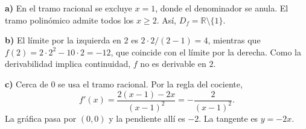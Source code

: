 \textbf{a)} En el tramo racional se excluye $x=1$, donde el denominador se anula. El tramo polinómico admite todos los $x\ge2$. Así, $D_f=\boxed{\mathbb R\setminus\{1\}}$.

\textbf{b)} El límite por la izquierda en $2$ es $2\cdot2/(2-1)=4$, mientras que $f(2)=2\cdot2^2-10\cdot2=-12$, que coincide con el límite por la derecha. Como la derivabilidad implica continuidad, $f$ no es derivable en $2$.

\textbf{c)} Cerca de $0$ se usa el tramo racional. Por la regla del cociente,
\[
 f'(x)=\frac{2(x-1)-2x}{(x-1)^2}=-\frac2{(x-1)^2}.
\]
La gráfica pasa por $(0,0)$ y la pendiente allí es $-2$. La tangente es $\boxed{y=-2x}$.
